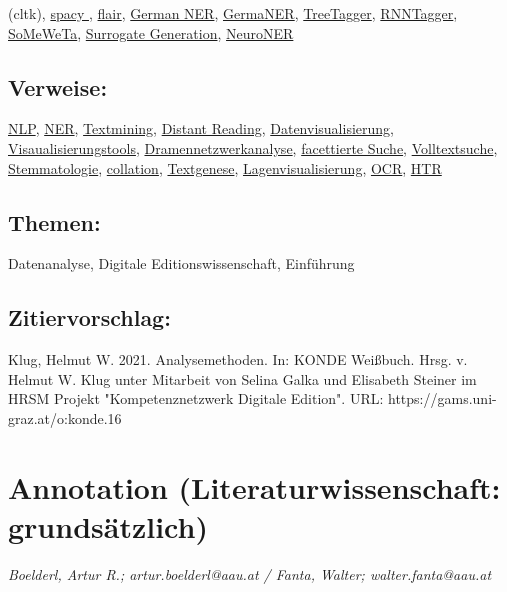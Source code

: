 \documentclass{article}
\begin{document}
{                           (cltk)}, \href{https://spacy.io/}{spacy }, \href{https://github.com/zalandoresearch/flair}{flair}, \href{https://www.ims.uni-stuttgart.de/forschung/ressourcen/werkzeuge/german-ner/}{German NER}, \href{https://github.com/tudarmstadt-lt/GermaNER}{GermaNER}, \href{https://www.cis.uni-muenchen.de/~schmid/tools/TreeTagger/}{TreeTagger}, \href{https://www.cis.uni-muenchen.de/~schmid/tools/RNNTagger/}{RNNTagger}, \href{https://github.com/tsproisl/SoMeWeTa}{SoMeWeTa}, \href{https://github.com/ee-2/SurrogateGeneration}{Surrogate Generation}, \href{http://neuroner.com/}{NeuroNER}\subsection*{Verweise:}\href{https://gams.uni-graz.at/o:konde.145}{NLP}, \href{https://gams.uni-graz.at/o:konde.141}{NER}, \href{https://gams.uni-graz.at/o:konde.194}{Textmining}, \href{https://gams.uni-graz.at/o:konde.71}{Distant Reading}, \href{https://gams.uni-graz.at/o:konde.54}{Datenvisualisierung}, \href{https://gams.uni-graz.at/o:konde.210}{Visaualisierungstools}, \href{https://gams.uni-graz.at/o:konde.74}{Dramennetzwerkanalyse}, \href{https://gams.uni-graz.at/o:konde.82}{facettierte Suche}, \href{https://gams.uni-graz.at/o:konde.211}{Volltextsuche}, \href{https://gams.uni-graz.at/o:konde.172}{Stemmatologie}, \href{https://gams.uni-graz.at/o:konde.105}{collation}, \href{https://gams.uni-graz.at/o:konde.28}{Textgenese}, \href{https://gams.uni-graz.at/o:konde.113}{Lagenvisualisierung}, \href{https://gams.uni-graz.at/o:konde.149}{OCR}, \href{https://gams.uni-graz.at/o:konde.224}{HTR}\subsection*{Themen:}Datenanalyse, Digitale Editionswissenschaft, Einführung\subsection*{Zitiervorschlag:}Klug, Helmut W. 2021. Analysemethoden. In: KONDE Weißbuch. Hrsg. v. Helmut W. Klug unter Mitarbeit von Selina Galka und Elisabeth Steiner im HRSM Projekt "Kompetenznetzwerk Digitale Edition". URL: https://gams.uni-graz.at/o:konde.16\newpage\section*{Annotation (Literaturwissenschaft: grundsätzlich)} \emph{Boelderl, Artur R.; artur.boelderl@aau.at / Fanta, Walter; walter.fanta@aau.at}\\
        
\end{document}
